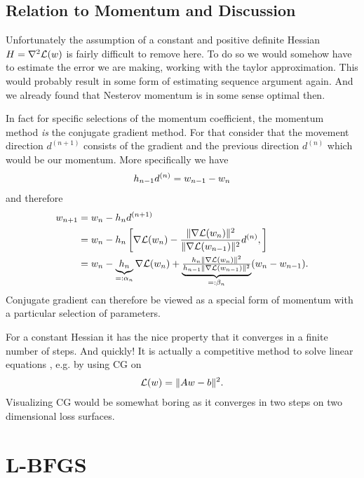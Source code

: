 \subsection{Relation to Momentum and Discussion}

Unfortunately the assumption of a constant and positive definite Hessian
\(H=\nabla^2\mathcal{L}(w)\) is fairly difficult to remove here. To do so
we would somehow have to estimate the error we are making, working with the taylor
approximation. This would probably result in some form of estimating sequence
argument again. And we already found that Nesterov momentum is in some sense
optimal then.

In fact for specific selections of the momentum coefficient, the momentum method
\emph{is} the conjugate gradient method. For that consider that the movement
direction \(d^{(n+1)}\) consists of the gradient and the previous direction
\(d^{(n)}\) which would be our momentum. More specifically we have
\begin{align*}
	h_{n-1}d^{(n)} = w_{n-1} - w_n
\end{align*}
and therefore
\begin{align*}
	w_{n+1}
	&= w_n - h_n d^{(n+1)}\\
	&= w_n - h_n \left[
		\nabla\mathcal{L}(w_n)
		- \frac{\|\nabla\mathcal{L}(w_n)\|^2}{\|\nabla\mathcal{L}(w_{n-1})\|^2}
		d^{(n)},
	\right]\\
	&= w_n - \underbrace{h_n}_{=:\alpha_n} \nabla\mathcal{L}(w_n)
		+ \underbrace{\tfrac{h_n\|\nabla\mathcal{L}(w_n)\|^2}{h_{n-1}\|\nabla\mathcal{L}(w_{n-1})\|^2}}_{=:\beta_n}
		(w_n-w_{n-1}).
\end{align*}
Conjugate gradient can therefore be viewed as a special form of momentum with
a particular selection of parameters.

For a constant Hessian it has the nice property that it converges in
a finite number of steps. And quickly! It is actually a competitive method to
solve linear equations \parencite[Section 10]{shewchukIntroductionConjugateGradient1994},
e.g. by using CG on
\begin{align*}
	\mathcal{L}(w) = \|Aw - b\|^2.
\end{align*}
Visualizing CG would be somewhat boring as it converges in two steps on two
dimensional loss surfaces.

\section{L-BFGS}

